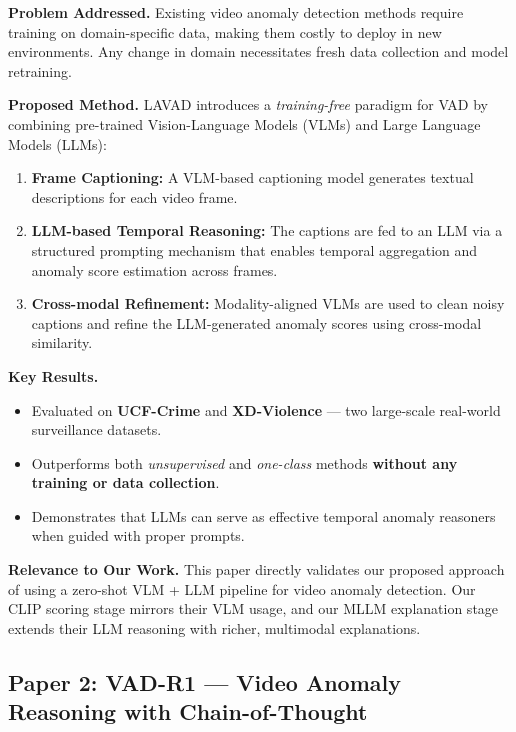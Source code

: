 \documentclass[12pt, a4paper]{article}
\begin{document}
\vspace{0.8em}

\textbf{Problem Addressed.}
Existing video anomaly detection methods require training on domain-specific data, making them costly to deploy in new environments. Any change in domain necessitates fresh data collection and model retraining.

\textbf{Proposed Method.}
LAVAD introduces a \textit{training-free} paradigm for VAD by combining pre-trained Vision-Language Models (VLMs) and Large Language Models (LLMs):
\begin{enumerate}[leftmargin=1.5em]
    \item \textbf{Frame Captioning:} A VLM-based captioning model generates textual descriptions for each video frame.
    \item \textbf{LLM-based Temporal Reasoning:} The captions are fed to an LLM via a structured prompting mechanism that enables temporal aggregation and anomaly score estimation across frames.
    \item \textbf{Cross-modal Refinement:} Modality-aligned VLMs are used to clean noisy captions and refine the LLM-generated anomaly scores using cross-modal similarity.
\end{enumerate}

\textbf{Key Results.}
\begin{itemize}[leftmargin=1.5em]
    \item Evaluated on \textbf{UCF-Crime} and \textbf{XD-Violence} --- two large-scale real-world surveillance datasets.
    \item Outperforms both \textit{unsupervised} and \textit{one-class} methods \textbf{without any training or data collection}.
    \item Demonstrates that LLMs can serve as effective temporal anomaly reasoners when guided with proper prompts.
\end{itemize}

\textbf{Relevance to Our Work.}
This paper directly validates our proposed approach of using a zero-shot VLM + LLM pipeline for video anomaly detection. Our CLIP scoring stage mirrors their VLM usage, and our MLLM explanation stage extends their LLM reasoning with richer, multimodal explanations.

\vspace{1.5em}

\subsection{Paper 2: VAD-R1 --- Video Anomaly Reasoning with Chain-of-Thought}
\end{document}
